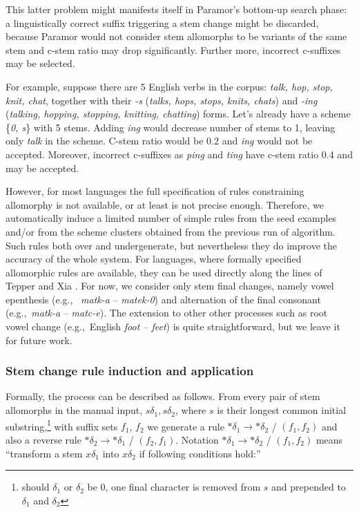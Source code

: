 \documentclass{itatnew}
\newcommand{\e}[1]{\textit{#1}} %
\newcommand{\eg}{e.g.,~}
\newcommand{\todoja}[1]{[\textbf{TODOJ} #1]}
\begin{document}
This latter problem might manifests itself in Paramor's bottom-up search phase: a linguistically correct suffix triggering a stem change might be discarded, because Paramor would not consider stem allomorphs to be variants of the same stem and c-stem ratio may drop significantly. Further more, incorrect c-suffixes may be selected.

For example, suppose there are 5 English verbs in the corpus: \emph{talk, hop, stop, knit, chat}, together with their \emph{-s} (\emph{talks, hops, stops, knits, chats}) and \emph{-ing} (\emph{talking, hopping, stopping, knitting, chatting}) forms. Let's already have a scheme \{\emph{0, s}\} with 5 stems. Adding \emph{ing} would decrease number of stems to 1, leaving only \emph{talk} in the scheme. C-stem ratio would be 0.2 and \emph{ing} would not be accepted. Moreover, incorrect c-suffixes as \emph{ping} and \emph{ting} have c-stem ratio 0.4 and may be accepted.


However, for most languages the full specification of rules constraining allomorphy is not available, or at least is not precise enough. Therefore, we automatically induce a limited number of simple rules from the seed examples and/or from the scheme clusters obtained from the previous run of algorithm. Such rules both over and undergenerate, but nevertheless they do improve the accuracy of the whole system. For languages, where formally specified allomorphic rules are available, they can be used directly along the lines of Tepper and Xia \cite{tepper10,tepper-xia-2008}.
%
For now, we consider only stem final changes, namely vowel epenthesis (\eg
\e{matk-a} -- \e{matek-0}) and alternation of the final consonant (\eg \e{matk-a} -- \e{matc-e}). The extension to other other processes such as root vowel change (\eg English \e{foot -- feet}) is quite straightforward, but we leave it for future work.



\subsubsection{Stem change rule induction and application}

\noindent
Formally, the process can be described as follows.
From every pair of stem allomorphs in the manual input, $s\delta_1, s\delta_2$, where $s$ is their longest common initial substring,\footnote{should $\delta_1$ or $\delta_2$ be 0, one final character is removed from $s$ and prepended to $\delta_1$ and $\delta_2$} with suffix
sets $f_1$, $f_2$ we generate a rule $*\delta_1 \rightarrow *\delta_2$ / $(f_1, f_2)$ and also a reverse rule $*\delta_2 \rightarrow *\delta_1$ / $(f_2, f_1)$. Notation $*\delta_1 \rightarrow *\delta_2$ / $(f_1, f_2)$ means ``transform a stem $x\delta_1$ into $x\delta_2$ if following conditions hold:''
\end{document}
